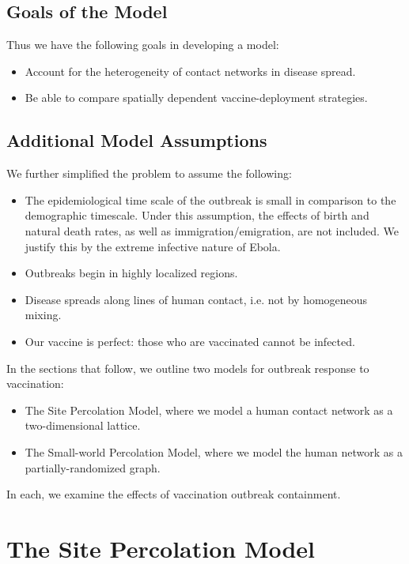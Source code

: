 \documentclass{article}
\begin{document}
\subsection{Goals of the Model}
Thus we have the following goals in developing a model:
\begin{itemize}
\item Account for the heterogeneity of contact networks in disease spread.
\item Be able to compare spatially dependent vaccine-deployment strategies.
\end{itemize}

\subsection{Additional Model Assumptions}
We further simplified the problem to assume the following:
\begin{itemize}
\item The epidemiological time scale of the outbreak is small in comparison to the demographic timescale. Under this assumption, the effects of birth and natural death rates, as well as immigration/emigration, are not included. We justify this by the extreme infective nature of Ebola.
\item Outbreaks begin in highly localized regions.
\item Disease spreads along lines of human contact, i.e. not by homogeneous mixing.
\item Our vaccine is perfect: those who are vaccinated cannot be infected.
\end{itemize}

In the sections that follow, we outline two models for outbreak response to vaccination:
\begin{itemize}
\item The Site Percolation Model, where we model a human contact network as a two-dimensional lattice. 
\item The Small-world Percolation Model, where we model the human network as a partially-randomized graph.
\end{itemize}

In each, we examine the effects of vaccination outbreak containment.

\section{The Site Percolation Model}
\end{document}
